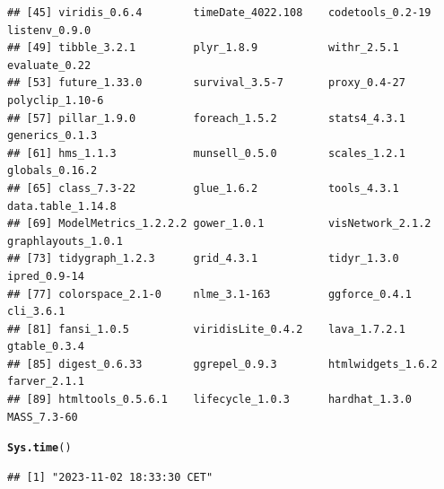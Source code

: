 \documentclass{article}\usepackage[]{graphicx}\usepackage[]{xcolor}
\makeatletter
\newcommand{\hlstd}[1]{\textcolor[rgb]{0.345,0.345,0.345}{#1}}%
\newcommand{\hlkwd}[1]{\textcolor[rgb]{0.737,0.353,0.396}{\textbf{#1}}}%
\newenvironment{kframe}{%
 \def\at@end@of@kframe{}%
 \ifinner\ifhmode%
  \def\at@end@of@kframe{\end{minipage}}%
  \begin{minipage}{\columnwidth}%
 \fi\fi%
 \def\FrameCommand##1{\hskip\@totalleftmargin \hskip-\fboxsep
 \colorbox{shadecolor}{##1}\hskip-\fboxsep
     \hskip-\linewidth \hskip-\@totalleftmargin \hskip\columnwidth}%
 \MakeFramed {\advance\hsize-\width
   \@totalleftmargin\z@ \linewidth\hsize
   \@setminipage}}%
 {\par\unskip\endMakeFramed%
 \at@end@of@kframe}
\newenvironment{knitrout}{}{} %
\makeatother
\begin{document}
\begin{knitrout}
\begin{kframe}
\begin{verbatim}
## [45] viridis_0.6.4        timeDate_4022.108    codetools_0.2-19     listenv_0.9.0       
## [49] tibble_3.2.1         plyr_1.8.9           withr_2.5.1          evaluate_0.22       
## [53] future_1.33.0        survival_3.5-7       proxy_0.4-27         polyclip_1.10-6     
## [57] pillar_1.9.0         foreach_1.5.2        stats4_4.3.1         generics_0.1.3      
## [61] hms_1.1.3            munsell_0.5.0        scales_1.2.1         globals_0.16.2      
## [65] class_7.3-22         glue_1.6.2           tools_4.3.1          data.table_1.14.8   
## [69] ModelMetrics_1.2.2.2 gower_1.0.1          visNetwork_2.1.2     graphlayouts_1.0.1  
## [73] tidygraph_1.2.3      grid_4.3.1           tidyr_1.3.0          ipred_0.9-14        
## [77] colorspace_2.1-0     nlme_3.1-163         ggforce_0.4.1        cli_3.6.1           
## [81] fansi_1.0.5          viridisLite_0.4.2    lava_1.7.2.1         gtable_0.3.4        
## [85] digest_0.6.33        ggrepel_0.9.3        htmlwidgets_1.6.2    farver_2.1.1        
## [89] htmltools_0.5.6.1    lifecycle_1.0.3      hardhat_1.3.0        MASS_7.3-60
\end{verbatim}
\begin{alltt}
\hlkwd{Sys.time}\hlstd{()}
\end{alltt}
\begin{verbatim}
## [1] "2023-11-02 18:33:30 CET"
\end{verbatim}
\end{kframe}
\end{knitrout}
\end{document}
